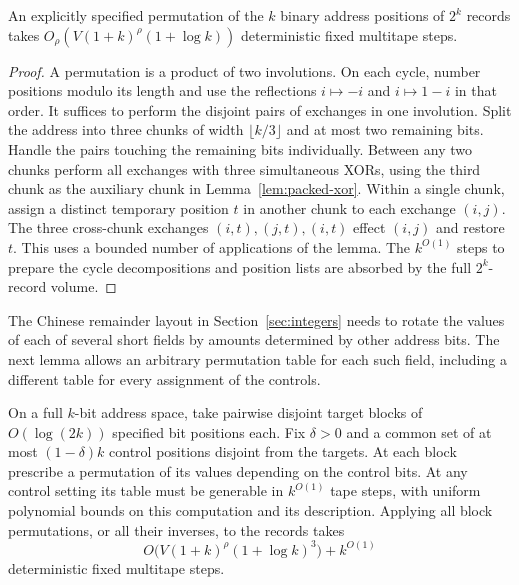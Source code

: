 \begin{corollary}\label{cor:bit-positions}
An explicitly specified permutation of the $k$ binary address positions
of $2^k$ records takes
$O_\rho(V(1+k)^\rho(1+\log k))$ deterministic fixed multitape steps.
\end{corollary}

\begin{proof}
A permutation is a product of two involutions. On each cycle, number
positions modulo its length and use the reflections $i\mapsto-i$ and
$i\mapsto1-i$ in that order. It suffices to perform the disjoint pairs
of exchanges in one involution. Split the address into three chunks
of width $\lfloor k/3\rfloor$ and at most two remaining bits. Handle
the pairs touching the remaining bits individually. Between any two
chunks perform all exchanges with three simultaneous XORs, using
the third chunk as the auxiliary chunk in Lemma~\ref{lem:packed-xor}.
Within a single chunk, assign a distinct temporary position $t$ in
another chunk to each exchange $(i,j)$. The three cross-chunk exchanges
$(i,t),(j,t),(i,t)$ effect $(i,j)$ and restore $t$. This uses a
bounded number of applications of the lemma. The $k^{O(1)}$ steps to
prepare the cycle decompositions and position lists are absorbed by
the full $2^k$-record volume.
\end{proof}

The Chinese remainder layout in Section~\ref{sec:integers} needs to
rotate the values of each of several short fields by amounts determined
by other address bits. The next lemma allows an arbitrary permutation
table for each such field, including a different table for every
assignment of the controls.

\begin{lemma}\label{lem:controlled-blocks}
On a full $k$-bit address space, take pairwise disjoint target blocks of
$O(\log(2k))$ specified bit positions each. Fix $\delta>0$ and a common
set of at most $(1-\delta)k$ control positions disjoint from the targets.
At each block prescribe a permutation of its values depending on the
control bits. At any control setting its table must be generable in
$k^{O(1)}$ tape steps, with uniform polynomial bounds on this computation
and its description. Applying all block permutations, or all their
inverses, to the records takes
\[
 O\bigl(V(1+k)^\rho(1+\log k)^3\bigr)+k^{O(1)}
\]
deterministic fixed multitape steps.
\end{lemma}

